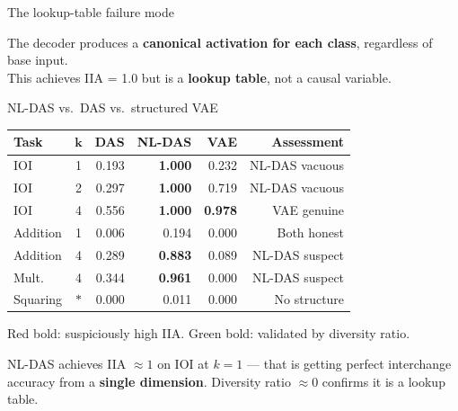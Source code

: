 \documentclass[aspectratio=169,11pt]{beamer}
\begin{document}
\begin{frame}{The lookup-table failure mode}
\begin{center}
\end{center}

\vspace{0.2em}
\begin{center}
{\small The decoder produces a \textbf{canonical activation for each class}, regardless of base input.\\This achieves IIA = 1.0 but is a \textbf{lookup table}, not a causal variable.}
\end{center}
\end{frame}

\begin{frame}{NL-DAS vs.\ DAS vs.\ structured VAE}

\centering
{\small\setlength{\tabcolsep}{4pt}
\begin{tabular}{lc rrrr}
\toprule
\textbf{Task} & $\boldsymbol{k}$ & \textbf{DAS} & \textbf{NL-DAS} & \textbf{VAE} & \textbf{Assessment} \\
\midrule
IOI & 1 & 0.193 & \textcolor{fail}{\textbf{1.000}} & 0.232 & NL-DAS vacuous \\
IOI & 2 & 0.297 & \textcolor{fail}{\textbf{1.000}} & 0.719 & NL-DAS vacuous \\
IOI & 4 & 0.556 & \textcolor{fail}{\textbf{1.000}} & \textcolor{pass}{\textbf{0.978}} & VAE genuine \\
Addition & 1 & 0.006 & 0.194 & 0.000 & Both honest \\
Addition & 4 & 0.289 & \textcolor{fail}{\textbf{0.883}} & 0.089 & NL-DAS suspect \\
Mult. & 4 & 0.344 & \textcolor{fail}{\textbf{0.961}} & 0.000 & NL-DAS suspect \\
Squaring & $*$ & 0.000 & 0.011 & 0.000 & No structure \\
\bottomrule
\end{tabular}}

\vspace{0.5em}
{\small \textcolor{fail}{Red bold}: suspiciously high IIA. \textcolor{pass}{Green bold}: validated by diversity ratio.}

\vspace{0.3em}
{\small NL-DAS achieves IIA $\approx 1$ on IOI at $k=1$ --- that is getting perfect interchange accuracy from a \textbf{single dimension}. Diversity ratio $\approx 0$ confirms it is a lookup table.}
\end{frame}
\end{document}

